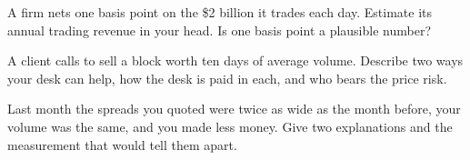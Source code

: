 \begin{interviewq}\label{iq:m1:what-a-trading-firm-does:4}
A firm nets one basis point on the \$2 billion it trades each day. Estimate
its annual trading revenue in your head. Is one basis point a plausible
number?
\end{interviewq}

\begin{interviewq}\label{iq:m1:what-a-trading-firm-does:5}
A client calls to sell a block worth ten days of average volume. Describe
two ways your desk can help, how the desk is paid in each, and who bears the
price risk.
\end{interviewq}

\begin{interviewq}\label{iq:m1:what-a-trading-firm-does:6}
Last month the spreads you quoted were twice as wide as the month before,
your volume was the same, and you made less money. Give two explanations and
the measurement that would tell them apart.
\end{interviewq}
